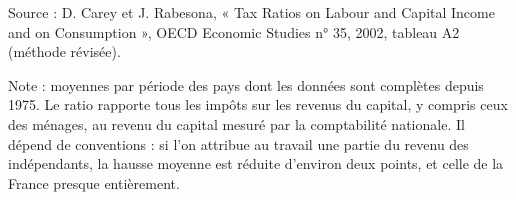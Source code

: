 Source : D. Carey et J. Rabesona, « Tax Ratios on Labour and Capital Income and on Consumption », OECD Economic Studies n° 35, 2002, tableau A2 (méthode révisée).\par Note : moyennes par période des pays dont les données sont complètes depuis 1975. Le ratio rapporte tous les impôts sur les revenus du capital, y compris ceux des ménages, au revenu du capital mesuré par la comptabilité nationale. Il dépend de conventions : si l'on attribue au travail une partie du revenu des indépendants, la hausse moyenne est réduite d'environ deux points, et celle de la France presque entièrement.

